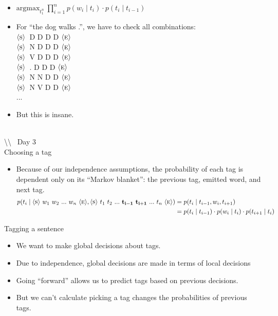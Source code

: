 \documentclass[11pt,letterpaper]{article}
\newcommand{\bs}{\textbackslash}
\newcommand{\ngramstart}{\ensuremath{\langle \textsc{s} \rangle}}
\newcommand{\ngramend}{\ensuremath{\langle \textsc{e} \rangle}}
\begin{document}
\begin{itemize}
  \item $\text{argmax}_{t_1^n}~\prod_{i=1}^n p(w_i \mid t_i) \cdot p(t_i \mid t_{i-1})$
  \item For ``the dog walks .'', we have to check all combinations: \vspace{2mm} \\
        \ngramstart\ D D D D \ngramend  \vspace{2mm} \\
        \ngramstart\ N D D D \ngramend  \vspace{2mm} \\
        \ngramstart\ V D D D \ngramend  \vspace{2mm} \\
        \ngramstart\ . D D D \ngramend  \vspace{2mm} \\
        \ngramstart\ N N D D \ngramend  \vspace{2mm} \\
        \ngramstart\ N V D D \ngramend  \vspace{2mm} \\
        ...
  \item But this is insane.
\end{itemize}



~\\ \bs\bs~ Day 3 \\

Choosing a tag

\begin{itemize}
  \item Because of our independence assumptions, the probability of each tag is dependent only on its ``Markov blanket'': the previous tag, emitted word, and next tag.  
    \begin{align*} p(t_i \mid \ngramstart~w_1~w_2~...~w_n~\ngramend, \ngramstart~t_1~t_2~...~\mathbf{t_{i-1}~t_{i+1}}~...~t_n~\ngramend)
       &= p(t_i \mid t_{i-1}, w_i, t_{i+1}) \\
       &= p(t_i \mid t_{i-1}) \cdot p(w_i \mid t_i) \cdot p(t_{i+1} \mid t_i)
    \end{align*}
\end{itemize}

Tagging a sentence

\begin{itemize}
  \item We want to make global decisions about tags.
  \item Due to independence, global decisions are made in terms of local decisions
  \item Going ``forward'' allows us to predict tags based on previous decisions.
  \item But we can't calculate picking a tag changes the probabilities of previous tags.
\end{itemize}
\end{document}
